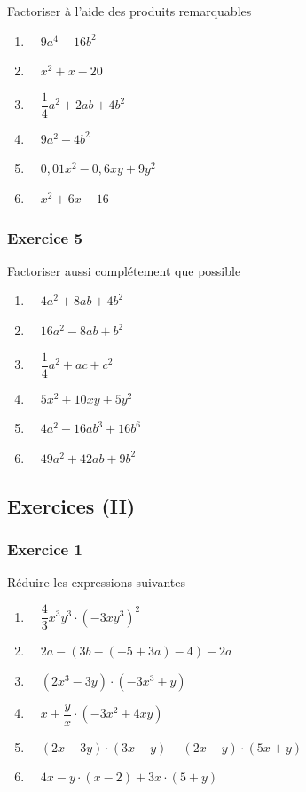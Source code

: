\documentclass[
  12pt,
]{book}
\providecommand{\tightlist}{%
  \setlength{\itemsep}{0pt}\setlength{\parskip}{0pt}}
\begin{document}
Factoriser à l'aide des produits remarquables

\begin{enumerate}
\def\labelenumi{\arabic{enumi}.}
\tightlist
\item
  \(\quad 9a^4-16b^2\)
\item
  \(\quad x^2 + x -20\)
\item
  \(\quad \dfrac{1}{4}a^2+2ab+4b^2\)
\item
  \(\quad 9a^2-4b^2\)
\item
  \(\quad 0{,}01x^2-0{,}6xy+9y^2\)
\item
  \(\quad x^2+6x-16\)
\end{enumerate}

\hypertarget{exercice-5-4}{%
\subsubsection*{Exercice 5}\label{exercice-5-4}}

Factoriser aussi complétement que possible

\begin{enumerate}
\def\labelenumi{\arabic{enumi}.}
\tightlist
\item
  \(\quad 4a^2+8ab+4b^2\)
\item
  \(\quad 16a^2-8ab+b^2\)
\item
  \(\quad \dfrac{1}{4}a^2+ac+c^2\)
\item
  \(\quad 5x^2+10xy+5y^2\)
\item
  \(\quad 4a^2-16ab^3+16b^6\)
\item
  \(\quad 49a^2+42ab+9b^2\)
\end{enumerate}

\hypertarget{exercices-ii-2}{%
\subsection{Exercices (II)}\label{exercices-ii-2}}

\hypertarget{exercice-1-5}{%
\subsubsection*{Exercice 1}\label{exercice-1-5}}

Réduire les expressions suivantes

\begin{enumerate}
\def\labelenumi{\arabic{enumi}.}
\tightlist
\item
  \(\quad \dfrac{4}{3}x^3y^3\cdot(-3xy^3)^2\)
\item
  \(\quad 2a-(3b-(-5+3a)-4)-2a\)
\item
  \(\quad (2x^3-3y)\cdot(-3x^3+y)\)
\item
  \(\quad x+\dfrac{y}{x}\cdot(-3x^2+4xy)\)
\item
  \(\quad (2x-3y)\cdot(3x-y)-(2x-y)\cdot(5x+y)\)
\item
  \(\quad 4x-y\cdot(x-2)+3x\cdot(5+y)\)
\end{enumerate}
\end{document}
